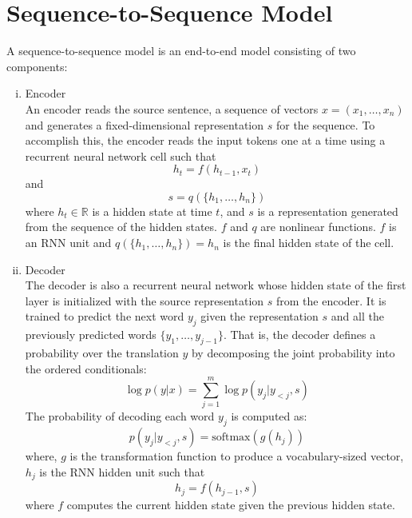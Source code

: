 \section{Sequence-to-Sequence Model}
A sequence-to-sequence model is an end-to-end model consisting of two components:
\begin{enumerate}[i.]
\item Encoder
\\
An encoder reads the source sentence, a sequence of vectors $x = (x_1, \ldots, x_n)$ and  generates a fixed-dimensional representation $s$ for the sequence. To accomplish this, the encoder reads the input tokens one at a time using a recurrent neural network cell such that
\begin{equation}
\label{eq:1.1}
h_t = f(h_{t-1}, x_t)
\end{equation}
and
\begin{equation}
\label{eq:1.2}
s = q(\{h_1, \ldots, h_n\})
\end{equation}
where 
$h_t \in \mathbb {R}$ is a hidden state at time $t$, and $s$ is a representation generated from the sequence of the hidden states. $f$ and $q$ are nonlinear functions. $f$ is an RNN unit and $q(\{h_1, \ldots, h_n\}) = h_n$ is the final hidden state of the cell.

\item Decoder
\\
The decoder is also a recurrent neural network whose hidden state of the first layer is initialized with the source representation $s$ from the encoder. It is trained to predict the next word $y_j$ given the representation $s$ and all the previously predicted words $\{y_1, \ldots, y_{j−1}\}$. That is, the decoder defines a probability over the translation $y$ by decomposing the joint probability into the ordered conditionals:
\begin{equation}
\label{eq:1.3}
\log p(y|x) = \sum_{j=1}^{m} \log p(y_j|y_{<j}, s)
\end{equation}
The probability of decoding each word $y_j$ is computed as:
\begin{equation}
\label{eq:1.4}
p(y_j|y_{<j}, s) = \text{softmax}(g(h_j))
\end{equation}
where, $g$ is the transformation function to produce a vocabulary-sized vector, $h_j$ is the RNN hidden unit such that
\begin{equation}
\label{eq:1.5}
h_j = f(h_{j-1}, s)
\end{equation}
where $f$ computes the current hidden state given the previous hidden state.
\end{enumerate}
